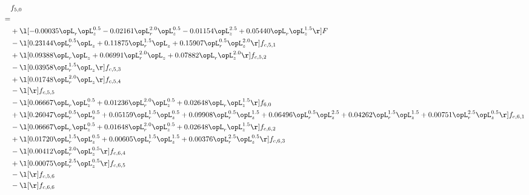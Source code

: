 \begin{alignat}{2} 
\label{eq:f_50_2} 
& f_{5,0} \nonumber \\ 
 = \\ 
& + \l[  -0.00035 \opL_r \opL_z^{0.5}   -0.02161 \opL_r^{2.0} \opL_z^{0.5}   -0.01154 \opL_z^{2.5} +  0.05440 \opL_r \opL_z^{1.5}  \r] F \nonumber \\ 
& - \l[  0.23144 \opL_r^{0.5} \opL_z +  0.11875 \opL_r^{1.5} \opL_z +  0.15907 \opL_r^{0.5} \opL_z^{2.0}  \r] f_{c,5,1} \nonumber \\ 
& + \l[  0.09388 \opL_r \opL_z +  0.06991 \opL_r^{2.0} \opL_z +  0.07882 \opL_r \opL_z^{2.0}  \r] f_{c,5,2} \nonumber \\ 
& - \l[  0.03958 \opL_r^{1.5} \opL_z  \r] f_{c,5,3} \nonumber \\ 
& + \l[  0.01748 \opL_r^{2.0} \opL_z  \r] f_{c,5,4} \nonumber \\ 
& - \l[  \r] f_{c,5,5} \nonumber \\ 
& - \l[  0.06667 \opL_r \opL_z^{0.5} +  0.01236 \opL_r^{2.0} \opL_z^{0.5} +  0.02648 \opL_r \opL_z^{1.5}  \r] f_{6,0} \nonumber \\ 
& + \l[  0.26047 \opL_r^{0.5} \opL_z^{0.5} +  0.05159 \opL_r^{1.5} \opL_z^{0.5} +  0.09908 \opL_r^{0.5} \opL_z^{1.5} +  0.06496 \opL_r^{0.5} \opL_z^{2.5} +  0.04262 \opL_r^{1.5} \opL_z^{1.5} +  0.00751 \opL_r^{2.5} \opL_z^{0.5}  \r] f_{c,6,1} \nonumber \\ 
& - \l[  0.06667 \opL_r \opL_z^{0.5} +  0.01648 \opL_r^{2.0} \opL_z^{0.5} +  0.02648 \opL_r \opL_z^{1.5}  \r] f_{c,6,2} \nonumber \\ 
& + \l[  0.01720 \opL_r^{1.5} \opL_z^{0.5} +  0.00605 \opL_r^{1.5} \opL_z^{1.5} +  0.00376 \opL_r^{2.5} \opL_z^{0.5}  \r] f_{c,6,3} \nonumber \\ 
& - \l[  0.00412 \opL_r^{2.0} \opL_z^{0.5}  \r] f_{c,6,4} \nonumber \\ 
& + \l[  0.00075 \opL_r^{2.5} \opL_z^{0.5}  \r] f_{c,6,5} \nonumber \\ 
& - \l[  \r] f_{c,5,6} \nonumber \\ 
& - \l[  \r] f_{c,6,6} \nonumber \\ 
\end{alignat} 


